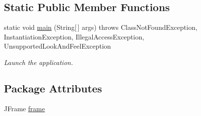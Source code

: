\subsection*{Static Public Member Functions}
\begin{DoxyCompactItemize}
\item 
static void \hyperlink{classCTC__gui_ad97ec7b3c189ca4cb572df0156b9a330}{main} (String\mbox{[}$\,$\mbox{]} args)  throws Class\+Not\+Found\+Exception, Instantiation\+Exception, Illegal\+Access\+Exception, Unsupported\+Look\+And\+Feel\+Exception 
\begin{DoxyCompactList}\small\item\em Launch the application. \end{DoxyCompactList}\end{DoxyCompactItemize}
\subsection*{Package Attributes}
\begin{DoxyCompactItemize}
\item 
J\+Frame \hyperlink{classCTC__gui_aac594c597dd95e3dbdda3050143a62f1}{frame}
\end{DoxyCompactItemize}
